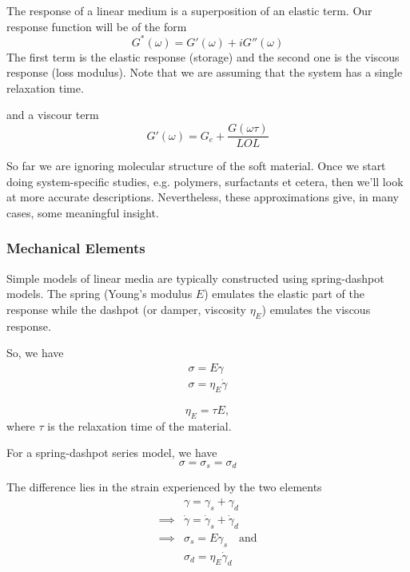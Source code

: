 \documentclass[a4paper]{article}
\begin{document}
The response of a linear medium is a superposition of an elastic term.
Our response function will be of the form
\begin{equation}
	G^{*}(\omega) = G'(\omega) + iG''(\omega)
\end{equation}
The first term is the elastic response (storage) and the second one
is the viscous response (loss modulus). Note that we are assuming
that the system has a single relaxation time.

and a viscour term
\begin{equation}
	G'(\omega) = G_{e} + \frac{G(\omega\tau)}{LOL}
\end{equation}

So far we are ignoring molecular structure of the soft material. Once
we start doing system-specific studies, e.g. polymers, surfactants et
cetera, then we'll look at more accurate descriptions. Nevertheless,
these approximations give, in many cases, some meaningful insight.

\subsubsection*{Mechanical Elements}
Simple models of linear media are typically constructed using spring-dashpot 
models. The spring (Young's modulus $E$) emulates the elastic part of the response while the
dashpot (or damper, viscosity $\eta_E$) emulates the viscous response.

So, we have
\begin{equation}
	\begin{split}
		\sigma = E\gamma\\
		\sigma= \eta_E \dot{\gamma}
	\end{split}
\end{equation}

\begin{equation}
	\eta_E = \tau E, %
\end{equation}
where $\tau$ is the relaxation time of the material.

For a spring-dashpot series model, we have
\begin{equation}
	\sigma = \sigma_s = \sigma_d
\end{equation}

The difference lies in the strain experienced by the two elements
\begin{equation}
	\begin{split}
		&\gamma = \gamma_s + \gamma_d\\
		\implies &\dot{\gamma} = \dot{\gamma}_s + \dot\gamma_d\\
		\implies & \sigma_s = E\gamma_s\quad \text{and}\\
			 &\sigma_d = \eta_E \dot\gamma_d
	\end{split}
\end{equation}
\end{document}
